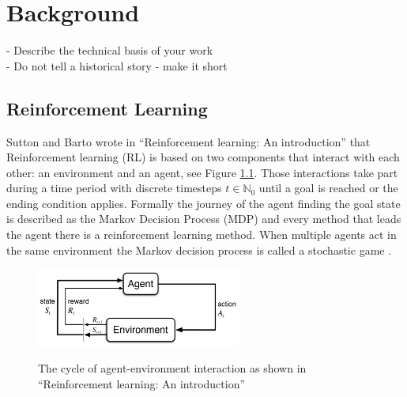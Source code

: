 \chapter{Background}\label{sec:Background}
- Describe the technical basis of your work \\
- Do not tell a historical story - make it short

\section{Reinforcement Learning}
Sutton and Barto wrote in ``Reinforcement learning: An introduction''\cite{suba18} that Reinforcement learning (RL) is based on two components that interact with each other: an environment and an agent, see Figure \ref{fig:rl_cycle}. Those interactions take part during a time period with discrete timesteps $t\in\mathbb{N}_0$ until a goal is reached or the ending condition applies. Formally the journey of the agent finding the goal state is described as the Markov Decision Process (MDP) and every method that leads the agent there is a reinforcement learning method. When multiple agents act in the same environment the Markov decision process is called a stochastic game \cite{buba10}.
\begin{figure}[hpbt]
    \centering
    \includegraphics[width=0.6\textwidth]{pictures/RLInteractionSB}\\
    \caption[reinforcement learning cycle]{The cycle of agent-environment interaction as
        shown in ``Reinforcement learning: An introduction''\cite{suba18}}\label{fig:rl_cycle}
\end{figure}

